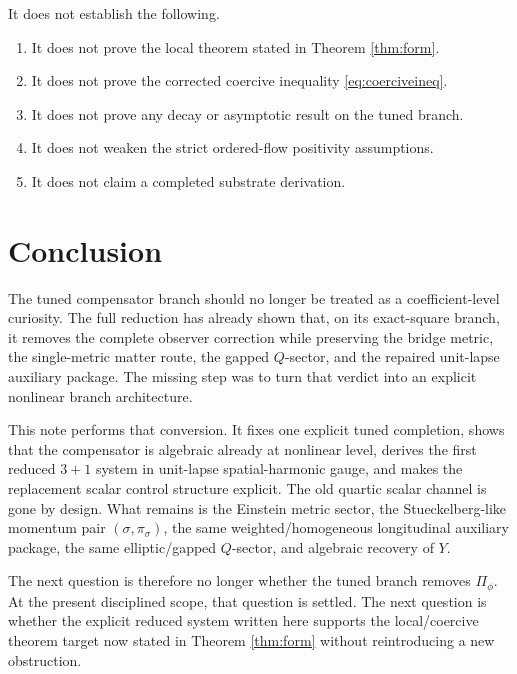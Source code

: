 \documentclass[11pt]{article}
\begin{document}
It does not establish the following.
\begin{enumerate}
    \item It does not prove the local theorem stated in Theorem \ref{thm:form}.
    \item It does not prove the corrected coercive inequality \eqref{eq:coerciveineq}.
    \item It does not prove any decay or asymptotic result on the tuned branch.
    \item It does not weaken the strict ordered-flow positivity assumptions.
    \item It does not claim a completed substrate derivation.
\end{enumerate}

\section{Conclusion}

The tuned compensator branch should no longer be treated as a coefficient-level curiosity. The full reduction has already shown that, on its exact-square branch, it removes the complete observer correction while preserving the bridge metric, the single-metric matter route, the gapped \(Q\)-sector, and the repaired unit-lapse auxiliary package. The missing step was to turn that verdict into an explicit nonlinear branch architecture.

This note performs that conversion. It fixes one explicit tuned completion, shows that the compensator is algebraic already at nonlinear level, derives the first reduced \(3+1\) system in unit-lapse spatial-harmonic gauge, and makes the replacement scalar control structure explicit. The old quartic scalar channel is gone by design. What remains is the Einstein metric sector, the Stueckelberg-like momentum pair \((\sigma,\pi_\sigma)\), the same weighted/homogeneous longitudinal auxiliary package, the same elliptic/gapped \(Q\)-sector, and algebraic recovery of \(Y\).

The next question is therefore no longer whether the tuned branch removes \(\Pi_\phi\). At the present disciplined scope, that question is settled. The next question is whether the explicit reduced system written here supports the local/coercive theorem target now stated in Theorem \ref{thm:form} without reintroducing a new obstruction.
\end{document}
